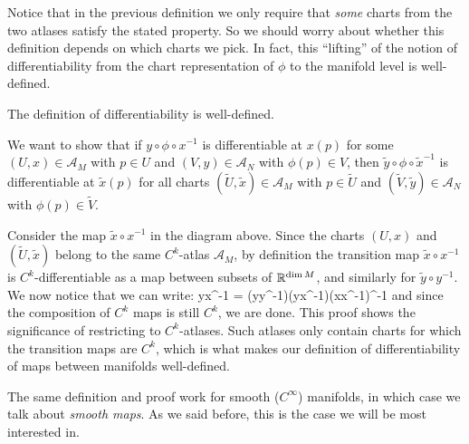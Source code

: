 Notice that in the previous definition we only require that \emph{some} charts from the two atlases satisfy the stated property. So we should worry about whether this definition depends on which charts we pick. In fact, this ``lifting'' of the notion of differentiability from the chart representation of $\phi$ to the manifold level is well-defined.

\bp
The definition of differentiability is well-defined.
\ep

\bq
We want to show that if $y\circ\phi\circ x^{-1}$ is differentiable at $x(p)$ for some $(U,x)\in\mathscr{A}_M$ with $p\in U$ and $(V,y)\in\mathscr{A}_N$ with $\phi(p)\in V$, then $\widetilde y\circ\phi\circ \widetilde x^{-1}$ is differentiable at $\widetilde x(p)$ for all charts $(\widetilde U,\widetilde x)\in\mathscr{A}_M$ with $p\in \widetilde U$ and $(\widetilde V,\widetilde y)\in\mathscr{A}_N$ with $\phi(p)\in \widetilde V$.
\bse
{}
\ese
Consider the map $\widetilde x\circ x^{-1}$ in the diagram above. Since the charts $(U,x)$ and $(\widetilde U,\widetilde x)$ belong to the same $C^k$-atlas $\mathscr{A}_M$, by definition the transition map $\widetilde x\circ x^{-1}$ is $C^k$-differentiable as a map between subsets of $\mathbb{R}^{\dim M}$, and similarly for $\widetilde y\circ y^{-1}$. We now notice that we can write:
\bse
\widetilde y\circ\phi\circ \widetilde x^{-1} = (\widetilde y\circ y^{-1})\circ(y\circ\phi\circ x^{-1})\circ(\widetilde x\circ x^{-1})^{-1}
\ese
and since the composition of $C^k$ maps is still $C^k$, we are done.
\eq
This proof shows the significance of restricting to $C^k$-atlases. Such atlases only contain charts for which the transition maps are $C^k$, which is what makes our definition of differentiability of maps between manifolds well-defined.

The same definition and proof work for smooth ($C^\infty$) manifolds, in which case we talk about \emph{smooth maps}. As we said before, this is the case we will be most interested in.

